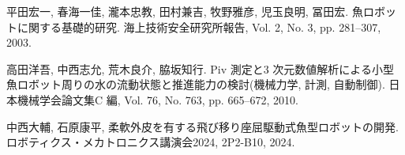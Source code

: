 \documentclass{jarticle}
\begin{document}

% 
% 


\begin{thebibliography}{99}
   平田宏一, 春海一佳, 瀧本忠教, 田村兼吉, 牧野雅彦, 児玉良明, 冨田宏. 魚ロボットに関する基礎的研究. 海上技術安全研究所報告, Vol. 2, No. 3, pp. 281–307, 2003.

   高田洋吾, 中西志允, 荒木良介, 脇坂知行. Piv 測定と3 次元数値解析による小型魚ロボット周りの水の流動状態と推進能力の検討(機械力学, 計測, 自動制御). 日本機械学会論文集C 編, Vol. 76, No. 763, pp. 665–672, 2010.

   中西大輔, 石原康平, 柔軟外皮を有する飛び移り座屈駆動式魚型ロボットの開発. ロボティクス・メカトロニクス講演会2024, 2P2-B10, 2024.

\end{thebibliography}
\end{document}

